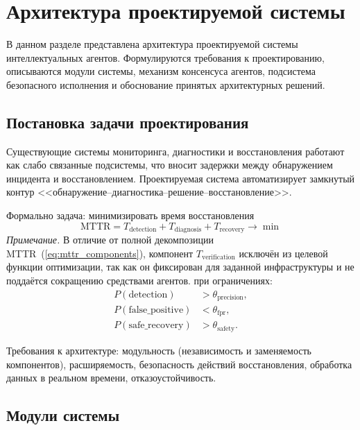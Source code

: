 \chapter{Архитектура проектируемой системы}\label{ch:architecture}

В данном разделе представлена архитектура проектируемой системы интеллектуальных агентов. Формулируются требования к проектированию, описываются модули системы, механизм консенсуса агентов, подсистема безопасного исполнения и обоснование принятых архитектурных решений.

\section{Постановка задачи проектирования}

Существующие системы мониторинга, диагностики и восстановления работают как слабо связанные подсистемы, что вносит задержки между обнаружением инцидента и восстановлением. Проектируемая система автоматизирует замкнутый контур <<обнаружение--диагностика--решение--восстановление>>.

Формально задача: минимизировать время восстановления
\begin{equation}
\text{MTTR} = T_{\text{detection}} + T_{\text{diagnosis}} + T_{\text{recovery}} \to \min
\label{eq:mttr_minimization}
\end{equation}
\textit{Примечание.} В отличие от полной декомпозиции MTTR~(\ref{eq:mttr_components}), компонент $T_{\text{verification}}$ исключён из целевой функции оптимизации, так как он фиксирован для заданной инфраструктуры и не поддаётся сокращению средствами агентов.
при ограничениях:
\begin{align}
P(\text{detection}) &> \theta_{\text{precision}}, \label{eq:precision_constraint} \\
P(\text{false\_positive}) &< \theta_{\text{fpr}}, \label{eq:fpr_constraint} \\
P(\text{safe\_recovery}) &> \theta_{\text{safety}}. \label{eq:safety_constraint}
\end{align}

Требования к архитектуре: модульность (независимость и заменяемость компонентов), расширяемость, безопасность действий восстановления, обработка данных в реальном времени, отказоустойчивость.

\section{Модули системы}

